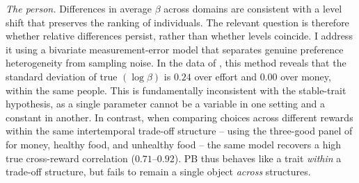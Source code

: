 \documentclass[11pt,a4paper]{article}
\theoremstyle{plain}
\theoremstyle{definition}
\begin{document}



\emph{The person.}
Differences in average $\beta$ across domains are %
consistent with a level shift that preserves the ranking of individuals. 
The relevant question is therefore whether relative differences persist, rather than whether %
levels coincide. I address it using a bivariate measurement-error model that separates genuine preference heterogeneity from sampling noise. 
In the data of \citet{ans2015}, %
this method reveals that the standard deviation of true %
$(\log\beta)$ is $0.24$ over effort and $0.00$ over money, within the same people. %
This is fundamentally inconsistent with the stable-trait hypothesis, as a single parameter cannot be a variable in one setting and a constant in another. 
In contrast, when comparing choices across different rewards within the same intertemporal trade-off structure -- using the three-good panel of \citet{cheung2022} for money, healthy food, and unhealthy food -- the same model recovers a high true cross-reward correlation ($0.71$--$0.92$). PB thus behaves like a trait \emph{within} a trade-off structure, but fails to remain a single object \emph{across} structures.
\end{document}
